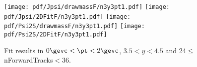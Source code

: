 \begin{figure}[H]
\begin{center}
\texttt{[image: pdf/Jpsi/drawmassF/n3y3pt1.pdf]}
\texttt{[image: pdf/Jpsi/2DFitF/n3y3pt1.pdf]}
\vspace*{-0.5cm}
\texttt{[image: pdf/Psi2S/drawmassF/n3y3pt1.pdf]}
\texttt{[image: pdf/Psi2S/2DFitF/n3y3pt1.pdf]}
\vspace*{-0.5cm}
\end{center}
\caption{Fit results in $0\gevc<\pt<2\gevc$, $3.5<y<4.5$ and 24$\leq$nForwardTracks$<$36.}
\label{Fitn3y3pt1}
\end{figure}
